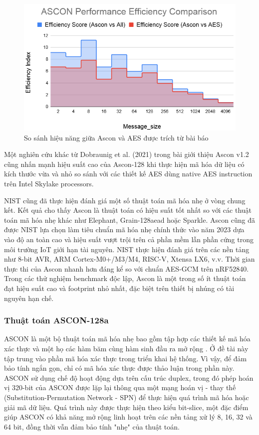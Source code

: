 \begin{figure}[h]
    \centering
    \includegraphics[width=0.7\linewidth]{ascon-aes.png}
    \caption{So sánh hiệu năng giữa Ascon và AES được trích từ bài báo}
    \label{fig:ascon-aes}
\end{figure}

Một nghiên cứu khác từ Dobraunig et al. (2021) trong bài giới thiệu Ascon v1.2 cũng nhấn mạnh hiệu suất cao của Ascon-128 khi thực hiện mã hóa dữ liệu có kích thước vừa và nhỏ so sánh với các thiết kế AES dùng native AES instruction trên Intel Skylake processors. 

NIST cũng đã thực hiện đánh giá một số thuật toán mã hóa nhẹ ở vòng chung kết. Kết quả cho thấy Ascon là thuật toán có hiệu suất tốt nhất so với các thuật toán mã hóa nhẹ khác như Elephant, Grain-128aead hoặc Sparkle. Ascon cũng đã được NIST lựa chọn làm tiêu chuẩn mã hóa nhẹ chính thức vào năm 2023 dựa vào độ an toàn cao và hiệu suất vượt trội trên cả phần mềm lẫn phần cứng trong môi trường IoT giới hạn tài nguyên. NIST thực hiện đánh giá trên các nền tảng như 8-bit AVR, ARM Cortex-M0+/M3/M4, RISC-V, Xtensa LX6, v.v. Thời gian thực thi của Ascon nhanh hơn đáng kể so với chuẩn AES-GCM trên nRF52840. Trong các thử nghiệm benchmark độc lập, Ascon là một trong số ít thuật toán đạt hiệu suất cao và footprint nhỏ nhất, đặc biệt trên thiết bị nhúng có tài nguyên hạn chế.

\subsubsection{Thuật toán ASCON-128a}
ASCON là một bộ thuật toán mã hóa nhẹ bao gồm tập hợp các thiết kế mã hóa xác thực và một họ các hàm băm cùng hàm sinh đầu ra mở rộng \cite{?}. Ở đề tài này tập trung vào phần mã hóa xác thực trong triển khai hệ thống. Vì vậy, để đảm bảo tính ngắn gọn, chỉ có mã hóa xác thực được thảo luận trong phần này. ASCON sử dụng chế độ hoạt động dựa trên cấu trúc duplex, trong đó phép hoán vị 320-bit của ASCON được lặp lại thông qua một mạng hoán vị - thay thế (Substitution-Permutation Network - SPN) để thực hiện quá trình mã hóa hoặc giải mã dữ liệu. Quá trình này được thực hiện theo kiểu bit-slice, một đặc điểm giúp ASCON có khả năng mở rộng linh hoạt trên các nền tảng xử lý 8, 16, 32 và 64 bit, đồng thời vẫn đảm bảo tính "nhẹ" của thuật toán.

